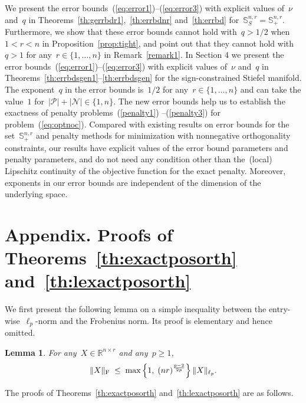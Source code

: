 \documentclass[11pt,a4paper]{article}  %
\newtheorem{lemma}{Lemma}%
\theoremstyle{definition}
\newcommand{\RR}{\mathbb{R}}
\newcommand{\col}{r}
\newcommand{\stf}[1]{\mathbb{S}^{#1}}
\newcommand{\fro}{{\scriptstyle{\textnormal{F}}}}
\newcommand{\tsign}{{\scriptscriptstyle{S}}}
\newcommand{\posset}{\mathcal{P}}
\newcommand{\negset}{\mathcal{N}}
\begin{document}
We present the error bounds~(\ref{eq:error1})--(\ref{eq:error3}) with explicit values of~$\nu$ and~$q$ in
Theorems~\ref{th:gerrbdr1},~\ref{th:errbdnr} and~\ref{th:errbd} for~$\stf{n, \col}_\tsign=\stf{n, \col}_+.$
Furthermore,
we show that these error bounds
cannot hold with~$q>{1}/{2}$ when~$1<\col<n$ in Proposition~\ref{prop:tight},
and point out that they cannot hold with~$q>1$ for any~$\col \in \{1, \dots, n\}$ in
Remark~\ref{remark1}.
In Section 4 we present the error bounds~(\ref{eq:error1})--(\ref{eq:error3}) with explicit values of~$\nu$ and~$q$ in
Theorems~\ref{th:errbdsgen1}--\ref{th:errbdsgen} for the sign-constrained Stiefel manifold. The exponent~$q$ in the error bounds is~$1/2$ for any~$\col \in\{1,\dots, n\}$
and can take the value~$1$ for~$|\posset|+|\negset|\in\{1,n\}$.
The new error bounds help us to establish the exactness of penalty problems~(\ref{penalty1})
--(\ref{penalty3}) for problem~(\ref{eq:optnoc}).
Compared with existing results on error bounds for the set~$\stf{n,\col}_+$ and penalty methods for minimization
with nonnegative orthogonality constraints, our results have explicit values of the error bound
parameters and penalty parameters,
and do not need any condition other than the~(local) Lipschitz continuity of the objective function for the exact penalty.
Moreover, exponents in our error bounds are independent of the dimension of the underlying space.


\appendix
\section{Appendix.  Proofs of Theorems~\ref{th:exactposorth} and~\ref{th:lexactposorth}}
\label{app:proof}


We first present the following lemma on a simple inequality between the entry-wise~$\ell_p$-norm and the
Frobenius norm. Its proof is elementary and hence omitted.
\begin{lemma}
    \label{lem:norm}
    For any~$X\in\RR^{n\times\col}$ and any~$p \ge 1$,
\begin{equation}
    \nonumber
    \|X\|_\fro \;\le\; \max\left\{ 1,\; (n\col)^{\frac{p-2}{2p}} \right\}\|X\|_{\ell_p}.
\end{equation}
\end{lemma}

The proofs of Theorems~\ref{th:exactposorth} and~\ref{th:lexactposorth} are as follows.
\end{document}
